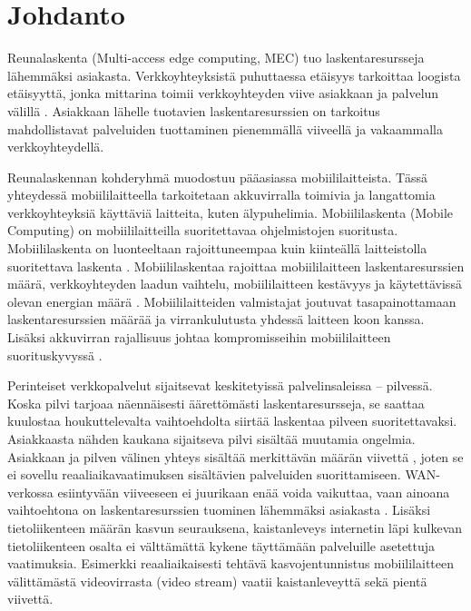 
\section{Johdanto}
Reunalaskenta (Multi-access edge computing, MEC) tuo laskentaresursseja lähemmäksi asiakasta.
Verkkoyhteyksistä puhuttaessa etäisyys tarkoittaa loogista etäisyyttä, jonka mittarina toimii verkkoyhteyden viive asiakkaan ja palvelun välillä \cite{satyanarayanan2017emergence}.
Asiakkaan lähelle tuotavien laskentaresurssien on tarkoitus mahdollistavat palveluiden tuottaminen pienemmällä viiveellä ja vakaammalla verkkoyhteydellä.



Reunalaskennan kohderyhmä muodostuu pääasiassa mobiililaitteista. 
Tässä yhteydessä mobiililaitteella tarkoitetaan akkuvirralla toimivia ja langattomia verkkoyhteyksiä käyttäviä laitteita, kuten älypuhelimia.
Mobiililaskenta (Mobile Computing) on mobiililaitteilla suoritettavaa ohjelmistojen suoritusta. 
Mobiililaskenta on luonteeltaan rajoittuneempaa kuin kiinteällä laitteistolla suoritettava laskenta \cite{ha2013just}.
Mobiililaskentaa rajoittaa mobiililaitteen laskentaresurssien määrä, verkkoyhteyden laadun vaihtelu, mobiililaitteen kestävyys ja käytettävissä olevan energian määrä \cite{satya96}. 
Mobiililaitteiden valmistajat joutuvat tasapainottamaan laskentaresurssien määrää ja virrankulutusta yhdessä laitteen koon kanssa.
Lisäksi akkuvirran rajallisuus johtaa kompromisseihin mobiililaitteen suorituskyvyssä \cite{satya01pervasive}.

Perinteiset verkkopalvelut sijaitsevat keskitetyissä palvelinsaleissa – pilvessä.
Koska pilvi tarjoaa näennäisesti äärettömästi laskentaresursseja, se saattaa kuulostaa houkuttelevalta vaihtoehdolta siirtää laskentaa pilveen suoritettavaksi.
Asiakkaasta nähden kaukana sijaitseva pilvi sisältää muutamia ongelmia.
Asiakkaan ja pilven välinen yhteys sisältää merkittävän määrän viivettä \cite{satya09}, joten se ei sovellu reaaliaikavaatimuksen sisältävien palveluiden suorittamiseen.
WAN-verkossa esiintyvään viiveeseen ei juurikaan enää voida vaikuttaa, vaan ainoana vaihtoehtona on laskentaresurssien tuominen lähemmäksi asiakasta \cite{satya09}.
Lisäksi tietoliikenteen määrän kasvun seurauksena, kaistanleveys internetin läpi kulkevan tietoliikenteen osalta ei välttämättä kykene täyttämään palveluille asetettuja vaatimuksia. 
Esimerkki reaaliaikaisesti tehtävä kasvojentunnistus mobiililaitteen välittämästä videovirrasta (video stream) vaatii kaistanleveyttä sekä pientä viivettä.

